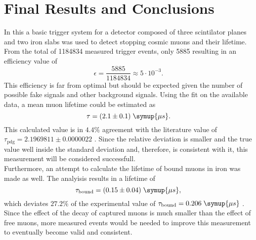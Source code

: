 \chapter{Final Results and Conclusions}
\label{sec:results}
In this a basic 
trigger system for a detector composed of three scintilator planes and two iron slabs 
was used to detect stopping cosmic muons and their lifetime. 
From the total of 1184834 measured trigger events, only 5885 resulting in an efficiency value of 
\begin{equation*}
    \epsilon = \frac{5885}{1184834} \approx 5 \cdot 10^{-3}.
\end{equation*}
This efficiency is far from optimal but should be expected given the number of possible fake signals
and other background signals. Using the fit on the available data, a mean muon lifetime could be 
estimated as 
\begin{equation*}
    \tau = (2.1 \pm 0.1) \; \symup{\mu s}.
\end{equation*}
This calculated value is in $4.4\%$ agreement with the literature value of $\tau_{\text{pdg}} = 2.1969811 \pm 0.0000022$ \cite{pdg}.
Since the relative deviation is smaller and the true value well inside the 
standard deviation and, therefore, is consistent with it, this measurement will be considered successfull.\\
Furthermore, an attempt to calculate the lifetime of bound muons in iron was made as well. 
The analyisis results in a lifetime of 
\begin{equation*}
    \tau_{\text{bound}} = (0.15 \pm 0.04) \; \symup{\mu s},
\end{equation*}
which deviates $27.2\%$ of the experimental value of $\tau_{\text{bound}} = 0.206 \;\symup{\mu s}$ \cite{lvd}.
Since the effect of the decay of captured muons is much smaller than the effect of free 
muons, more measured events would be needed to improve this measurement to eventually
become valid and consistent.
